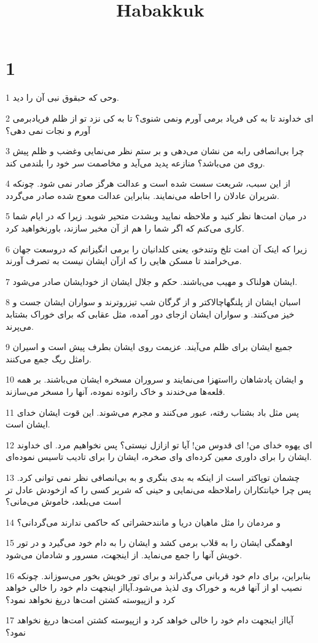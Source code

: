 

\title{Habakkuk}


\chapter{1}

\par 1 وحی که حبقوق نبی آن را دید.
\par 2 ‌ای خداوند تا به کی فریاد برمی آورم ونمی شنوی؟ تا به کی نزد تو از ظلم فریادبرمی آورم و نجات نمی دهی؟
\par 3 چرا بی‌انصافی رابه من نشان می‌دهی و بر ستم نظر می‌نمایی وغضب و ظلم پیش روی من می‌باشد؟ منازعه پدید می‌آید و مخاصمت سر خود را بلندمی کند.
\par 4 از این سبب، شریعت سست شده است و عدالت هرگز صادر نمی شود. چونکه شریران عادلان را احاطه می‌نمایند. بنابراین عدالت معوج شده صادر می‌گردد.
\par 5 در میان امت‌ها نظر کنید و ملاحظه نمایید وبشدت متحیر شوید. زیرا که در ایام شما کاری می‌کنم که اگر شما را هم از آن مخبر سازند، باورنخواهید کرد.
\par 6 زیرا که اینک آن امت تلخ وتندخو، یعنی کلدانیان را برمی انگیزانم که دروسعت جهان می‌خرامند تا مسکن هایی را که ازآن ایشان نیست به تصرف آورند.
\par 7 ایشان هولناک و مهیب می‌باشند. حکم و جلال ایشان از خودایشان صادر می‌شود.
\par 8 اسبان ایشان از پلنگهاچالاکتر و از گرگان شب تیزروترند و سواران ایشان جست و خیز می‌کنند. و سواران ایشان ازجای دور آمده، مثل عقابی که برای خوراک بشتابد می‌پرند.
\par 9 جمیع ایشان برای ظلم می‌آیند. عزیمت روی ایشان بطرف پیش است و اسیران رامثل ریگ جمع می‌کنند.
\par 10 و ایشان پادشاهان رااستهزا می‌نمایند و سروران مسخره ایشان می‌باشند. بر همه قلعه‌ها می‌خندند و خاک راتوده نموده، آنها را مسخر می‌سازند.
\par 11 پس مثل باد بشتاب رفته، عبور می‌کنند و مجرم می‌شوند. این قوت ایشان خدای ایشان است.
\par 12 ‌ای یهوه خدای من! ای قدوس من! آیا تو ازازل نیستی؟ پس نخواهیم مرد. ای خداوند ایشان را برای داوری معین کرده‌ای و‌ای صخره، ایشان را برای تادیب تاسیس نموده‌ای.
\par 13 چشمان توپاکتر است از اینکه به بدی بنگری و به بی‌انصافی نظر نمی توانی کرد. پس چرا خیانتکاران راملاحظه می‌نمایی و حینی که شریر کسی را که ازخودش عادل تر است می‌بلعد، خاموش می‌مانی؟
\par 14 و مردمان را مثل ماهیان دریا و مانندحشراتی که حاکمی ندارند می‌گردانی؟
\par 15 اوهمگی ایشان را به قلاب برمی کشد و ایشان را به دام خود می‌گیرد و در تور خویش آنها را جمع می‌نماید. از اینجهت، مسرور و شادمان می‌شود.
\par 16 بنابراین، برای دام خود قربانی می‌گذراند و برای تور خویش بخور می‌سوزاند. چونکه نصیب او از آنها فربه و خوراک وی لذیذ می‌شود.آیااز اینجهت دام خود را خالی خواهد کرد و ازپیوسته کشتن امت‌ها دریغ نخواهد نمود؟
\par 17 آیااز اینجهت دام خود را خالی خواهد کرد و ازپیوسته کشتن امت‌ها دریغ نخواهد نمود؟

